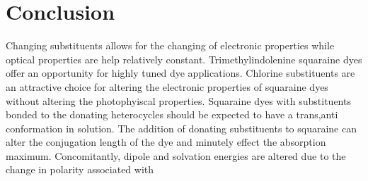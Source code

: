 \documentclass[journal=jacsat,manuscript=article]{achemso}
\begin{document}
\section{Conclusion}
Changing substituents allows for the changing of electronic properties while optical properties are help relatively constant. Trimethylindolenine squaraine dyes offer an opportunity for highly tuned dye applications. Chlorine substituents are an attractive choice for altering the electronic properties of squaraine dyes without altering the photophyiscal properties. Squaraine dyes with substituents bonded to the donating heterocycles should be expected to have a trans,anti conformation in solution. The addition of donating substituents to squaraine can alter the conjugation length of the dye and minutely effect the absorption maximum. Concomitantly, dipole and solvation energies are altered due to the change in polarity associated with 

\newpage
 

\end{document}
